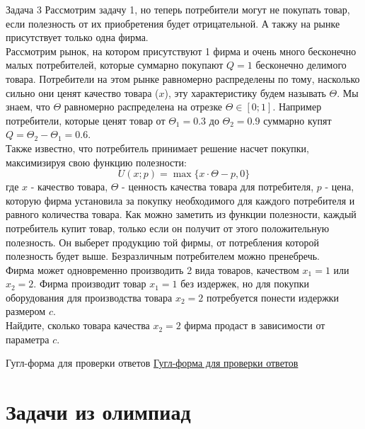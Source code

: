 \begin{mybox}{Задача 3}
    \indent\setlength{\parindent}{1em}\indent\setlength{\parindent}{1em}Рассмотрим задачу 1, но
    теперь потребители могут не покупать товар, если полезность от их приобретения будет отрицательной. А такжу на
    рынке присутствует только одна фирма.\\
    \indent\setlength{\parindent}{1em}Рассмотрим рынок, на котором присутствуют 1
    фирма и очень много бесконечно малых потребителей, которые суммарно покупают $Q=1$
    бесконечно делимого товара. Потребители на этом рынке равномерно распределены по тому, насколько сильно они ценят
    качество товара ($x$), эту характеристику будем называть $\Theta$. Мы знаем, что $\Theta$ равномерно
    распределена на отрезке $\Theta\in [0;1]$. Например потребители, которые ценят товар от $\Theta_1=0.3$ до
    $\Theta_2=0.9$ суммарно купят $Q=\Theta_2-\Theta_1=0.6$.\\
    \indent\setlength{\parindent}{1em}Также известно, что потребитель принимает решение насчет покупки, максимизируя
    свою функцию полезности:
    $$U(x;p)=\max\{x\cdot\Theta-p,0\}$$
    где $x$ - качество товара, $\Theta$ - ценность качества товара для потребителя, $p$ - цена, которую фирма
    установила за покупку необходимого для каждого потребителя и равного количества товара. Как можно заметить из
    функции полезности, каждый потребитель купит товар, только если он получит от этого положительную полезность. Он
    выберет продукцию той фирмы, от потребления которой полезность будет выше. Безразличным потребителем можно пренебречь.\\
    \indent\setlength{\parindent}{1em}Фирма может одновременно производить 2 вида товаров, качеством $x_1=1$ или $x_2
    =2$. Фирма производит товар $x_1=1$ без издержек, но для покупки оборудования для производства товара $x_2=2$
    потребуется понести издержки размером $c$.\\
    \indent\setlength{\parindent}{1em}Найдите, сколько товара качества $x_2=2$ фирма продаст в зависимости от
    параметра $c$.
\end{mybox}

\begin{mybox}{Гугл-форма для проверки ответов}
    \href{https://forms.gle/bvSCEMnsEMTttzgS8}{Гугл-форма для проверки ответов}
\end{mybox}

\section{Задачи из олимпиад}

